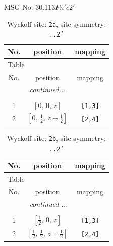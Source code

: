 \documentclass[fleqn,8pt]{jsarticle}
\begin{document}
\setcounter{MaxMatrixCols}{32}

\renewcommand{\tablename}{Table~}
\renewcommand{\figurename}{Figure~}
\begin{center}
\LARGE
MSG No. 30.113\quad$Pn'c2'$
\end{center}
\renewcommand{\arraystretch}{1.2}
\begin{longtable}{ccc}
\caption{Wyckoff site: {\tt 2a}, site symmetry: {\tt ..2'}}
 \\
 \hline \hline
No. & position & mapping \\ \hline \endfirsthead

\multicolumn{2}{l}{\tablename\ \thetable{}} \\
 \hline \hline
No. & position & mapping \\ \hline \endhead

 \hline \hline
\multicolumn{2}{r}{\footnotesize\it continued ...} \\ \endfoot

 \hline \hline
\multicolumn{2}{r}{} \\ \endlastfoot

1 & $\left[ 0,\, 0,\, z \right]$ & {\tt [1,3]} \\ \hline
2 & $\left[ 0,\, \frac{1}{2},\, z + \frac{1}{2} \right]$ & {\tt [2,4]} \\
\end{longtable}
\renewcommand{\arraystretch}{1.2}
\begin{longtable}{ccc}
\caption{Wyckoff site: {\tt 2b}, site symmetry: {\tt ..2'}}
 \\
 \hline \hline
No. & position & mapping \\ \hline \endfirsthead

\multicolumn{2}{l}{\tablename\ \thetable{}} \\
 \hline \hline
No. & position & mapping \\ \hline \endhead

 \hline \hline
\multicolumn{2}{r}{\footnotesize\it continued ...} \\ \endfoot

 \hline \hline
\multicolumn{2}{r}{} \\ \endlastfoot

1 & $\left[ \frac{1}{2},\, 0,\, z \right]$ & {\tt [1,3]} \\ \hline
2 & $\left[ \frac{1}{2},\, \frac{1}{2},\, z + \frac{1}{2} \right]$ & {\tt [2,4]} \\
\end{longtable}
\end{document}

